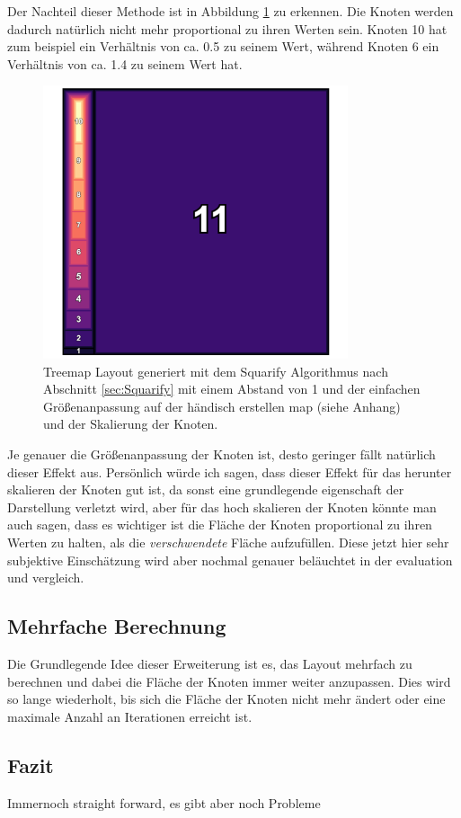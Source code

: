 Der Nachteil dieser Methode ist in Abbildung \ref{fig:simpleIncreaseMarginOneScale} zu erkennen. Die Knoten werden dadurch natürlich nicht mehr proportional zu ihren Werten sein. Knoten 10 hat zum beispiel ein Verhältnis von ca. 0.5 zu seinem Wert, während Knoten 6 ein Verhältnis von ca. 1.4 zu seinem Wert hat.

\begin{figure}
    \centering
    \includegraphics[width=0.8\textwidth]{images/simpleIncreaseMarginOneScale.png}
    \caption{Treemap Layout generiert mit dem Squarify Algorithmus nach Abschnitt \ref{sec:Squarify} mit einem Abstand von 1 und der einfachen Größenanpassung auf der händisch erstellen map (siehe Anhang) und der Skalierung der Knoten.}
    \label{fig:simpleIncreaseMarginOneScale}
\end{figure}

Je genauer die Größenanpassung der Knoten ist, desto geringer fällt natürlich dieser Effekt aus.
Persönlich würde ich sagen, dass dieser Effekt für das herunter skalieren der Knoten gut ist, da sonst eine grundlegende eigenschaft der Darstellung verletzt wird, aber für das hoch skalieren der Knoten könnte man auch sagen, dass es wichtiger ist die Fläche der Knoten proportional zu ihren Werten zu halten, als die \textit{verschwendete} Fläche aufzufüllen. Diese jetzt hier sehr subjektive Einschätzung wird aber nochmal genauer beläuchtet in der evaluation und vergleich.

\subsection{Mehrfache Berechnung} \label{sec:MehrfacheBerechnung}
Die Grundlegende Idee dieser Erweiterung ist es, das Layout mehrfach zu berechnen und dabei die Fläche der Knoten immer weiter anzupassen. Dies wird so lange wiederholt, bis sich die Fläche der Knoten nicht mehr ändert oder eine maximale Anzahl an Iterationen erreicht ist.

\subsection{Fazit}
Immernoch straight forward, es gibt aber noch Probleme 